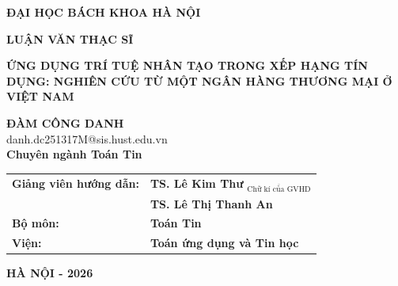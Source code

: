 \documentclass[a4paper]{report}
\begin{document}
\thispagestyle{empty}

\begin{center}
\fontsize{18pt}{15pt}\selectfont
{\bf ĐẠI HỌC BÁCH KHOA HÀ NỘI}
\end{center}
\vspace{1cm}
\begin{center}
\fontsize{18pt}{15pt}\selectfont

\vspace{1cm}
\textbf{LUẬN VĂN THẠC SĨ}\\
\end{center}

\vspace{1cm}
\begin{center}
\fontsize{16pt}{16.5pt}\selectfont

\bf ỨNG DỤNG TRÍ TUỆ NHÂN TẠO TRONG XẾP HẠNG TÍN DỤNG: NGHIÊN CỨU TỪ MỘT NGÂN HÀNG THƯƠNG MẠI Ở VIỆT NAM

\end{center}
\vspace{1cm}
 \begin{center}
	\fontsize{14pt}{16pt}\selectfont 	
	{\bf ĐÀM CÔNG DANH}\\	
	\fontsize{13pt}{16pt}\selectfont
	danh.dc251317M@sis.hust.edu.vn\\
	\fontsize{14pt}{16pt}\selectfont
	{\bf Chuyên ngành Toán Tin }\\
\end{center}

\vspace{2cm}
\begin{center}
\begin{tabular}{l l}
\Large \bf Giảng viên hướng dẫn:&{\Large \bf  TS. Lê Kim Thư} \quad $_{\overline{\text{Chữ kí của GVHD}}}$\\[0.5cm]
&\Large \bf{TS. Lê Thị Thanh An}\\[0.5cm]
\Large \bf Bộ môn:&{\Large\bf Toán Tin}\\[0.5cm]
\Large \bf Viện:&{\Large \bf Toán ứng dụng và Tin học}
\end{tabular}

\end{center}
\vspace{2cm}
\begin{center}
\LARGE \bf HÀ NỘI - 2026
\end{center}
\end{document}
